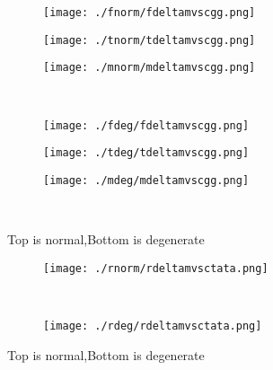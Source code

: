 \documentclass[aps,floats,floatfix,nofootinbib]{revtex4-1}
\begin{document}
\begin{center}
\begin{figure}
\begin{subfigure}{0.3\textwidth}
\texttt{[image: ./fnorm/fdeltamvscgg.png]}
\label{}
\end{subfigure}
\begin{subfigure}{0.3\textwidth}
\texttt{[image: ./tnorm/tdeltamvscgg.png]}
\label{}
\end{subfigure}
\begin{subfigure}{0.3\textwidth}
\texttt{[image: ./mnorm/mdeltamvscgg.png]}
\label{}
\end{subfigure}\\
\begin{subfigure}{0.3\textwidth}
\texttt{[image: ./fdeg/fdeltamvscgg.png]}
\label{}
\end{subfigure}
\begin{subfigure}{0.3\textwidth}
\texttt{[image: ./tdeg/tdeltamvscgg.png]}
\label{}
\end{subfigure}
\begin{subfigure}{0.3\textwidth}
\texttt{[image: ./mdeg/mdeltamvscgg.png]}
\label{}
\end{subfigure}\\
\caption{Top is normal,Bottom is degenerate}
\end{figure}
\end{center}

\begin{center}
\begin{figure}
\begin{subfigure}{0.95\textwidth}
\texttt{[image: ./rnorm/rdeltamvsctata.png]}
\label{}
\end{subfigure}\\
\begin{subfigure}{0.95\textwidth}
\texttt{[image: ./rdeg/rdeltamvsctata.png]}
\label{}
\end{subfigure}
\caption{Top is normal,Bottom is degenerate}
\end{figure}
\end{center}
\end{document}
